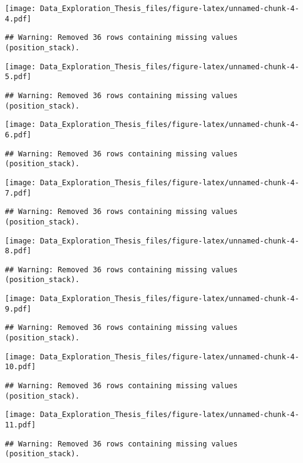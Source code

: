 \documentclass[]{article}
\begin{document}
\texttt{[image: Data\_Exploration\_Thesis\_files/figure-latex/unnamed-chunk-4-4.pdf]}

\begin{verbatim}
## Warning: Removed 36 rows containing missing values (position_stack).
\end{verbatim}

\texttt{[image: Data\_Exploration\_Thesis\_files/figure-latex/unnamed-chunk-4-5.pdf]}

\begin{verbatim}
## Warning: Removed 36 rows containing missing values (position_stack).
\end{verbatim}

\texttt{[image: Data\_Exploration\_Thesis\_files/figure-latex/unnamed-chunk-4-6.pdf]}

\begin{verbatim}
## Warning: Removed 36 rows containing missing values (position_stack).
\end{verbatim}

\texttt{[image: Data\_Exploration\_Thesis\_files/figure-latex/unnamed-chunk-4-7.pdf]}

\begin{verbatim}
## Warning: Removed 36 rows containing missing values (position_stack).
\end{verbatim}

\texttt{[image: Data\_Exploration\_Thesis\_files/figure-latex/unnamed-chunk-4-8.pdf]}

\begin{verbatim}
## Warning: Removed 36 rows containing missing values (position_stack).
\end{verbatim}

\texttt{[image: Data\_Exploration\_Thesis\_files/figure-latex/unnamed-chunk-4-9.pdf]}

\begin{verbatim}
## Warning: Removed 36 rows containing missing values (position_stack).
\end{verbatim}

\texttt{[image: Data\_Exploration\_Thesis\_files/figure-latex/unnamed-chunk-4-10.pdf]}

\begin{verbatim}
## Warning: Removed 36 rows containing missing values (position_stack).
\end{verbatim}

\texttt{[image: Data\_Exploration\_Thesis\_files/figure-latex/unnamed-chunk-4-11.pdf]}

\begin{verbatim}
## Warning: Removed 36 rows containing missing values (position_stack).
\end{verbatim}
\end{document}
